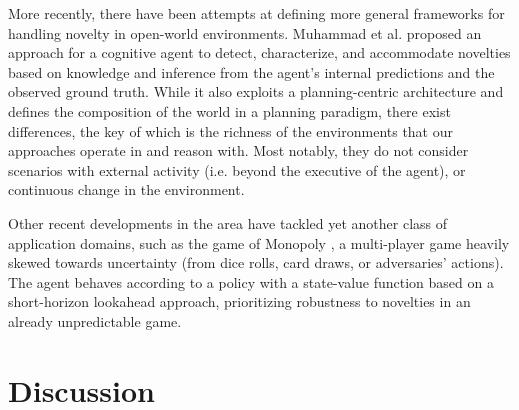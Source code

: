 \documentclass[letterpaper]{article} %
\begin{document}
More recently, there have been attempts at defining more general frameworks for handling novelty in open-world environments. 
Muhammad et al.  proposed an approach for a cognitive agent to detect, characterize, and accommodate novelties based on knowledge and inference from the agent's internal predictions and the observed ground truth. 
While it also exploits a planning-centric architecture and defines the composition of the world in a planning paradigm, there exist differences, the key of which is the richness of the environments that our approaches operate in and reason with. Most notably, they do not consider scenarios with external activity (i.e. beyond the executive of the agent), or continuous change in the environment. 

Other recent developments in the area have tackled yet another class of application domains, such as the game of Monopoly \cite{gopalakrishnan2021integrating}, a multi-player game heavily skewed towards uncertainty (from dice rolls, card draws, or adversaries' actions). The agent behaves according to a policy with a state-value function based on a short-horizon lookahead approach, prioritizing robustness to novelties in an already unpredictable game. 




\section{Discussion}
\end{document}

